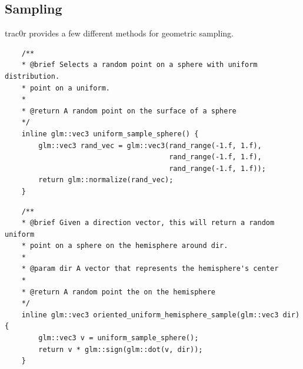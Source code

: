 \documentclass[
  twoside,
  11pt, a4paper,
  footinclude=true,
  headinclude=true,
  cleardoublepage=empty
]{scrreprt}
\begin{document}
\subsection{Sampling}
trac0r provides a few different methods for geometric sampling.

\begin{verbatim}
    /**
    * @brief Selects a random point on a sphere with uniform distribution.
    * point on a uniform.
    *
    * @return A random point on the surface of a sphere
    */
    inline glm::vec3 uniform_sample_sphere() {
        glm::vec3 rand_vec = glm::vec3(rand_range(-1.f, 1.f),
                                       rand_range(-1.f, 1.f),
                                       rand_range(-1.f, 1.f));
        return glm::normalize(rand_vec);
    }
\end{verbatim}
\begingroup
{}
\endgroup  

\begin{verbatim}
    /**
    * @brief Given a direction vector, this will return a random uniform
    * point on a sphere on the hemisphere around dir.
    *
    * @param dir A vector that represents the hemisphere's center
    *
    * @return A random point the on the hemisphere
    */
    inline glm::vec3 oriented_uniform_hemisphere_sample(glm::vec3 dir) {
        glm::vec3 v = uniform_sample_sphere();
        return v * glm::sign(glm::dot(v, dir));
    }
\end{verbatim}
\begingroup
{}
\endgroup
\end{document}
